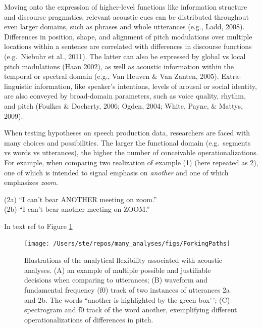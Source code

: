\documentclass[
  english,
  man,floatsintext]{apa6}
\begin{document}
Moving onto the expression of higher-level functions like information structure and discourse pragmatics, relevant acoustic cues can be distributed throughout even larger domains, such as phrases and whole utterances (e.g., Ladd, 2008).
Differences in position, shape, and alignment of pitch modulations over multiple locations within a sentence are correlated with differences in discourse functions (e.g.~Niebuhr et al., 2011).
The latter can also be expressed by global vs local pitch modulations (Haan 2002), as well as acoustic information within the temporal or spectral domain (e.g., Van Heuven \& Van Zanten, 2005).
Extra-linguistic information, like speaker's intentions, levels of arousal or social identity, are also conveyed by broad-domain parameters, such as voice quality, rhythm, and pitch (Foulkes \& Docherty, 2006; Ogden, 2004; White, Payne, \& Mattys, 2009).

When testing hypotheses on speech production data, researchers are faced with many choices and possibilities.
The larger the functional domain (e.g.~segments vs words vs utterances), the higher the number of conceivable operationalizations.
For example, when comparing two realization of example (1) (here repeated as 2), one of which is intended to signal emphasis on \emph{another} and one of which emphasizes \emph{zoom}.

(2a) ``I can't bear ANOTHER meeting on zoom.''\\
(2b) ``I can't bear another meeting on ZOOM.''

In text ref to Figure \ref{fig:forkingPaths}



\begin{figure}
\texttt{[image: /Users/ste/repos/many\_analyses/figs/ForkingPaths]} \caption{Illustrations of the analytical flexibility associated with acoustic analyses. (A) an example of multiple possible and justifiable decisions when comparing to utterances; (B) waveform and fundamental frequency (f0) track of two instances of utterances 2a and 2b. The words ``another is highlighted by the green box'\,'; (C) spectrogram and f0 track of the word another, exemplifying different operationalizations of differences in pitch.}\label{fig:forkingPaths}
\end{figure}
\end{document}
